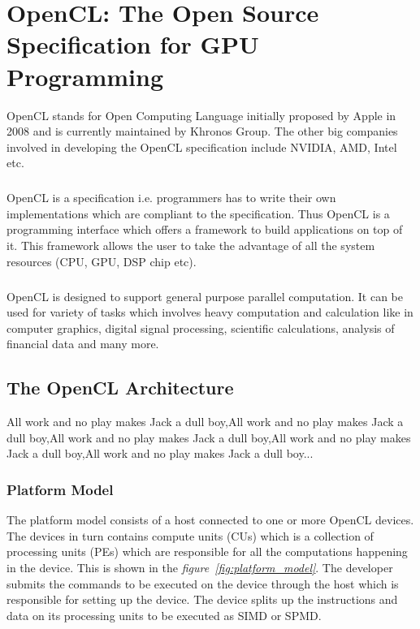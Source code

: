 \chapter{OpenCL: The Open Source Specification for GPU Programming}

OpenCL stands for Open Computing Language initially proposed by Apple in 2008 and is currently maintained by Khronos Group. The other big companies involved in developing the OpenCL specification include NVIDIA, AMD, Intel etc.

\paragraph{}
OpenCL is a specification i.e. programmers has to write their own implementations which are compliant to the specification. Thus OpenCL is a programming interface which offers a framework to build applications on top of it. This framework allows the user to take the advantage of all the system resources (CPU, GPU, DSP chip etc).

\paragraph{}
OpenCL is designed to support general purpose parallel computation. It can be used for variety of tasks which involves heavy computation and calculation like in computer graphics, digital signal processing, scientific calculations, analysis of financial data and many more.

\section{The OpenCL Architecture}
All work and no play makes Jack a dull boy,All work and no play makes Jack a dull boy,All work and no play makes Jack a dull boy,All work and no play makes Jack a dull boy,All work and no play makes Jack a dull boy...

\subsection{Platform Model}
The platform model consists of a host connected to one or more OpenCL devices. The devices in turn contains compute units (CUs) which is a collection of processing units (PEs) which are responsible for all the computations happening in the device. This is shown in the \textit{figure~\ref{fig:platform_model}}. The developer submits the commands to be executed on the device through the host which is responsible for setting up the device. The device splits up the instructions and data on its processing units to be executed as SIMD or SPMD. 

